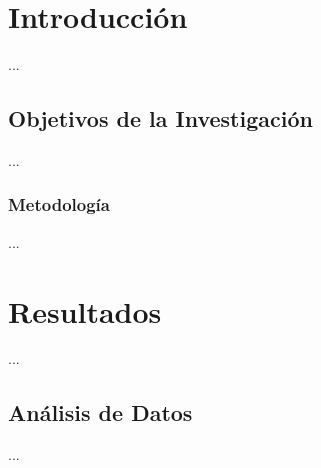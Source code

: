 \documentclass{report}
\begin{document}
\chapter{Introducción}
...
\section{Objetivos de la Investigación}
...
\subsection{Metodología}
...
\chapter{Resultados}
...
\section{Análisis de Datos}
...
\end{document}
